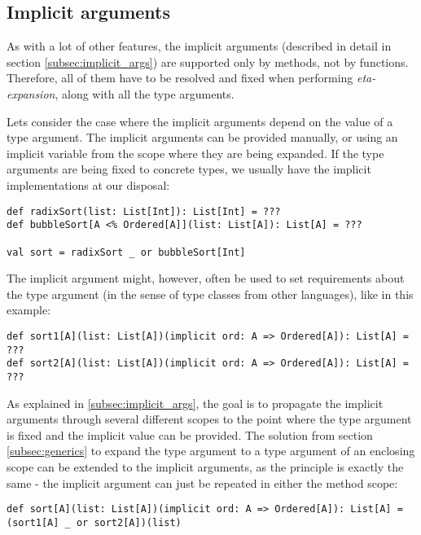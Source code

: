 \subsection{Implicit arguments}

As with a lot of other features, the implicit arguments (described in detail in section \ref{subsec:implicit_args}) are supported only by methods, not by functions. Therefore, all of them have to be resolved and fixed when performing \textit{eta-expansion}, along with all the type arguments. 

Lets consider the case where the implicit arguments depend on the value of a type argument. The implicit arguments can be provided manually, or using an implicit variable from the scope where they are being expanded. If the type arguments are being fixed to concrete types, we usually have the implicit implementations at our disposal:

\lstset{style=Scala}
\begin{lstlisting}
def radixSort(list: List[Int]): List[Int] = ???
def bubbleSort[A <% Ordered[A]](list: List[A]): List[A] = ???

val sort = radixSort _ or bubbleSort[Int]
\end{lstlisting}

The implicit argument might, however, often be used to set requirements about the type argument (in the sense of type classes from other languages), like in this example:
\lstset{style=Scala}
\begin{lstlisting}
def sort1[A](list: List[A])(implicit ord: A => Ordered[A]): List[A] = ???
def sort2[A](list: List[A])(implicit ord: A => Ordered[A]): List[A] = ???
\end{lstlisting}

As explained in \ref{subsec:implicit_args}, the goal is to propagate the implicit arguments through several different scopes to the point where the type argument is fixed and the implicit value can be provided. The solution from section \ref{subsec:generics} to expand the type argument to a type argument of an enclosing scope can be extended to the implicit arguments, as the principle is exactly the same - the implicit argument can just be repeated in either the method scope:

\lstset{style=Scala}
\begin{lstlisting}
def sort[A](list: List[A])(implicit ord: A => Ordered[A]): List[A] = (sort1[A] _ or sort2[A])(list)
\end{lstlisting}

